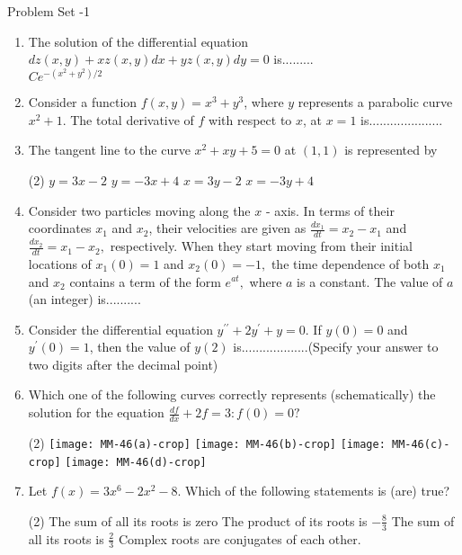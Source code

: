 \newpage
\begin{abox}
	Problem Set -1
\end{abox}
\begin{enumerate}[label=\color{ocre}\textbf{\arabic*.}]	
	\item The solution of the differential equation $d z(x, y)+x z(x, y) d x+y z(x, y) d y=0$ is.........{}\\
	$C e^{-\left(x^{2}+y^{2}\right) / 2}$
	
	\item  Consider a function $f(x, y)=x^{3}+y^{3}$, where $y$ represents a parabolic curve $x^{2}+1$. The total derivative of $f$ with respect to $x$, at $x=1$ is.....................
	{}
	\item The tangent line to the curve $x^{2}+x y+5=0$ at $(1,1)$ is represented by
	\begin{tasks}(2)
		\task[\textbf{a.}]$y=3 x-2$ 
		\task[\textbf{b.}]$y=-3 x+4$
		\task[\textbf{c.}]$x=3 y-2$ 
		\task[\textbf{d.}]$x=-3 y+4$  
	\end{tasks}
	
	\item Consider two particles moving along the $x$ - axis. In terms of their coordinates $x_{1}$ and $x_{2}$,
	their velocities are given as $\frac{d x_{1}}{d t}=x_{2}-x_{1}$ and $\frac{d x_{2}}{d t}=x_{1}-x_{2},$ respectively. When they start
	moving from their initial locations of $x_{1}(0)=1$ and $x_{2}(0)=-1,$ the time dependence of
	both $x_{1}$ and $x_{2}$ contains a term of the form $e^{a t},$ where $a$ is a constant. The value of $a$
	(an integer) is..........{}
	\item Consider the differential equation $y^{\prime \prime}+2 y^{\prime}+y=0$. If $y(0)=0$ and $y^{\prime}(0)=1$, then the
	value of $y(2)$ is...................(Specify your answer to two digits after the decimal point){}
	\item Which one of the following curves correctly represents (schematically) the solution for
	the equation $\frac{d f}{d x}+2 f=3: f(0)=0 ?${}
	\begin{tasks}(2)
		\task[\textbf{a.}]\texttt{[image: MM-46(a)-crop]}
		\task[\textbf{b.}]\texttt{[image: MM-46(b)-crop]}
		\task[\textbf{c.}] \texttt{[image: MM-46(c)-crop]}
		\task[\textbf{d.}]\texttt{[image: MM-46(d)-crop]} 
	\end{tasks}
	\item Let $f(x)=3 x^{6}-2 x^{2}-8$. Which of the following statements is (are) true?{}
	\begin{tasks}(2)
		\task[\textbf{a.}]  The sum of all its roots is zero
		\task[\textbf{b.}]The product of its roots is $-\frac{8}{3}$
		\task[\textbf{c.}] The sum of all its roots is $\frac{2}{3}$
		\task[\textbf{d.}]  Complex roots are conjugates of each other.
	\end{tasks}
	
\end{enumerate}
